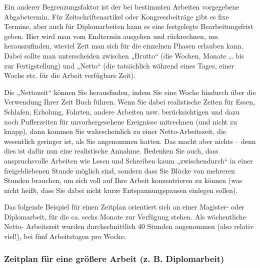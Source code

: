\documentclass[]{article}
\begin{document}
Ein anderer Begrenzungsfaktor ist der bei bestimmten Arbeiten
vorgegebene Abgabetermin. Für Zeitschriftenartikel oder Kongressbeiträge
gibt es fixe Termine, aber auch für Diplomarbeiten kann es eine
festgelegte Bearbeitungsfrist geben. Hier wird man vom Endtermin
ausgehen und rückrechnen, um herauszufinden, wieviel Zeit man sich für
die einzelnen Phasen erlauben kann. Dabei sollte man unterscheiden
zwischen „Brutto`` (die Wochen, Monate \ldots{} bis zur Fertigstellung)
und „Netto`` (die tatsächlich während eines Tages, einer Woche etc. für
die Arbeit verfügbare Zeit).

Die „Nettozeit`` können Sie herausfinden, indem Sie eine Woche hindurch
über die Verwendung Ihrer Zeit Buch führen. Wenn Sie dabei realistische
Zeiten für Essen, Schlafen, Erholung, Fahrten, andere Arbeiten usw.
berücksichtigen und dazu noch Pufferzeiten für unvorhergesehene
Ereignisse mitrechnen (und nicht zu knapp), dann kommen Sie
wahrscheinlich zu einer Netto-Arbeitszeit, die wesentlich geringer ist,
als Sie angenommen hatten. Das macht aber nichts -- denn dies ist dafür
nun eine realistische Annahme. Bedenken Sie auch, dass anspruchsvolle
Arbeiten wie Lesen und Schreiben kaum „zwischendurch`` in einer
freigebliebenen Stunde möglich sind, sondern dass Sie Blöcke von
mehreren Stunden brauchen, um sich voll auf Ihre Arbeit konzentrieren zu
können (was nicht heißt, dass Sie dabei nicht kurze Entspannungspausen
einlegen sollen).

Das folgende Beispiel für einen Zeitplan orientiert sich an einer
Magister- oder Diplomarbeit, für die ca. sechs Monate zur Verfügung
stehen. Als wöchentliche Netto- Arbeitszeit wurden durchschnittlich 40
Stunden angenommen (also relativ viel!), bei fünf Arbeitstagen pro
Woche:

\subsubsection{Zeitplan für eine größere Arbeit (z. B.
Diplomarbeit)}\label{zeitplan-fur-eine-groere-arbeit-z.-b.-diplomarbeit}
\end{document}
